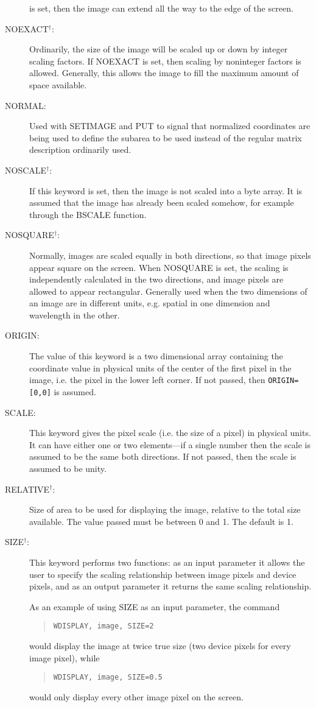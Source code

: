 \begin{description}
is set, then the image can extend all the way to the edge of the screen.
\item[NOEXACT$^\dagger$:]
Ordinarily, the size of the image will be scaled up or down by integer scaling
factors.  If NOEXACT is set, then scaling by noninteger factors is allowed.
Generally, this allows the image to fill the maximum amount of space available.
\item[NORMAL:]
Used with SETIMAGE and PUT to signal that normalized coordinates are being used
to define the subarea to be used instead of the regular matrix description
ordinarily used.
\item[NOSCALE$^\dagger$:]
If this keyword is set, then the image is not scaled into a byte array.  It is
assumed that the image has already been scaled somehow, for example through the
BSCALE function.
\item[NOSQUARE$^\dagger$:]
Normally, images are scaled equally in both directions, so that image pixels
appear square on the screen.  When NOSQUARE is set, the scaling is
independently calculated in the two directions, and image pixels are allowed to
appear rectangular.  Generally used when the two dimensions of an image are in
different units, e.g. spatial in one dimension and wavelength in the other.
\item[ORIGIN:]
The value of this keyword is a two dimensional array containing the coordinate
value in physical units of the center of the first pixel in the image, i.e. the
pixel in the lower left corner.  If not
passed, then \verb+ORIGIN=[0,0]+ is assumed.
\item[SCALE:]
This keyword gives the pixel scale (i.e. the size of a pixel) in physical
units.  It can have either one or two elements---if a single number then the
scale is assumed to be the same both directions.  If not passed, then the scale
is assumed to be unity.
\item[RELATIVE$^\dagger$:]
Size of area to be used for displaying the image, relative to the total size
available.  The value passed must be between 0 and 1.  The default is 1.
\item[SIZE$^\dagger$:]
This keyword performs two functions: as an input parameter it allows the user
to specify the scaling relationship between image pixels and device pixels, and
as an output parameter it returns the same scaling relationship.

As an example of using SIZE as an input parameter, the command
\begin{quote}
\begin{verbatim}
WDISPLAY, image, SIZE=2
\end{verbatim}
\end{quote}
would display the image at twice true size (two device pixels for every image
pixel), while
\begin{quote}
\begin{verbatim}
WDISPLAY, image, SIZE=0.5
\end{verbatim}
\end{quote}
would only display every other image pixel on the screen.


\end{description}
